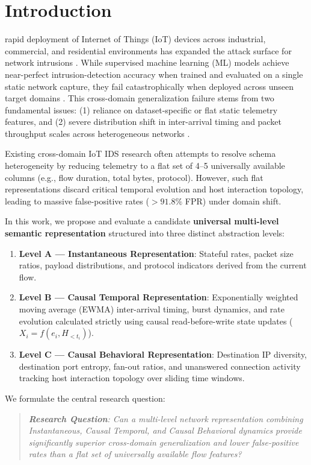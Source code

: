 \documentclass[10pt,journal,compsoc]{IEEEtran}
\begin{document}
\section{Introduction}
 rapid deployment of Internet of Things (IoT) devices across industrial, commercial, and residential environments has expanded the attack surface for network intrusions \cite{kouliaridis2021survey}. While supervised machine learning (ML) models achieve near-perfect intrusion-detection accuracy when trained and evaluated on a single static network capture, they fail catastrophically when deployed across unseen target domains \cite{sarhan2021towards}. This cross-domain generalization failure stems from two fundamental issues: (1) reliance on dataset-specific or flat static telemetry features, and (2) severe distribution shift in inter-arrival timing and packet throughput scales across heterogeneous networks \cite{bendavid2010theory}.

Existing cross-domain IoT IDS research often attempts to resolve schema heterogeneity by reducing telemetry to a flat set of 4--5 universally available columns (e.g., flow duration, total bytes, protocol). However, such flat representations discard critical temporal evolution and host interaction topology, leading to massive false-positive rates ($>91.8\%$ FPR) under domain shift.

In this work, we propose and evaluate a candidate \textbf{universal multi-level semantic representation} structured into three distinct abstraction levels:
\begin{enumerate}
    \item \textbf{Level A --- Instantaneous Representation}: Stateful rates, packet size ratios, payload distributions, and protocol indicators derived from the current flow.
    \item \textbf{Level B --- Causal Temporal Representation}: Exponentially weighted moving average (EWMA) inter-arrival timing, burst dynamics, and rate evolution calculated strictly using causal read-before-write state updates ($X_i = f(e_i, H_{<t_i})$).
    \item \textbf{Level C --- Causal Behavioral Representation}: Destination IP diversity, destination port entropy, fan-out ratios, and unanswered connection activity tracking host interaction topology over sliding time windows.
\end{enumerate}

We formulate the central research question:
\begin{quote}
\textit{\textbf{Research Question}: Can a multi-level network representation combining Instantaneous, Causal Temporal, and Causal Behavioral dynamics provide significantly superior cross-domain generalization and lower false-positive rates than a flat set of universally available flow features?}
\end{quote}
\end{document}
